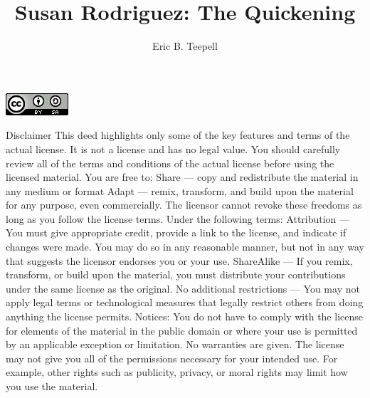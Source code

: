 \documentclass[12pt,twoside,onecolumn,openright,extrafontsizes]{memoir}
\title{Susan Rodriguez: The Quickening}
\author{Eric B. Teepell}
\begin{document}
\pagestyle{empty}
\cleardoublepage
\clearpage


\begin{center}
 	\centering
	\includegraphics[width=0.25\linewidth=0.25]{license.png}
\end{center}

\newpage
{\tiny Disclaimer This deed highlights only some of the key features and terms of the actual license. It is not a license and has no legal value. You should carefully review all of the terms and conditions of the actual license before using the licensed material. You are free to: Share — copy and redistribute the material in any medium or format Adapt — remix, transform, and build upon the material
for any purpose, even commercially. The licensor cannot revoke these freedoms as long as you follow the license terms. Under the following terms: Attribution — You must give appropriate credit, provide a link to the license, and indicate if changes were made. You may do so in any reasonable manner, but not in any way that suggests the licensor endorses you or your use. ShareAlike — If you remix, transform, or build upon the material, you must distribute your contributions under the same license as the original. No additional restrictions — You may not apply legal terms or technological measures that legally restrict others from doing anything the license permits. Notices: You do not have to comply with the license for elements of the material in the public domain or where your use is permitted by an applicable exception or limitation. No warranties are given. The license may not give you all of the permissions necessary for your intended use. For example, other rights such as publicity, privacy, or moral rights may limit how you use the material.
}
\clearpage
\end{document}
